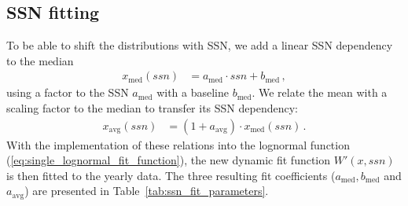 \subsection{SSN fitting}
\label{sec:ssn_fitting}
To be able to shift the distributions with SSN, we add a linear SSN dependency to the median
\begin{align}
	x_\text{med}(ssn) &= a_\text{med} \cdot ssn + b_\text{med}\,,	\label{eq:median_with_ssn}
\end{align}
using a factor to the SSN $a_\text{med}$ with a baseline $b_\text{med}$. We relate the mean with a scaling factor to the median to transfer its SSN dependency:
\begin{align}
	x_\text{avg}(ssn) &= (1 + a_\text{avg}) \cdot x_\text{med}(ssn)\,.	\label{eq:mean_with_ssn}
\end{align}
With the implementation of these relations into the lognormal function (\ref{eq:single_lognormal_fit_function}), the new dynamic fit function $W'(x,ssn)$ is then fitted to the yearly data. The three resulting fit coefficients ($a_\text{med}, b_\text{med}$ and $a_\text{avg}$) are presented in Table~\ref{tab:ssn_fit_parameters}.
